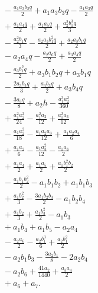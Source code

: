 \begin{align*}
&{}- \frac{a_{1} a_{3} b_{2} q}{2} + a_{1} a_{3} b_{3} q - \frac{a_{1} a_{3} q}{2}\\
&{}+ \frac{a_{1} a_{4} q}{2} + \frac{a_{1} a_{5} q}{2} + \frac{a_{2}^{2} b_{1}^{3} q}{3}\\
&{}- \frac{a_{2}^{2} b_{1} q}{3} - \frac{a_{2} a_{3} b_{1}^{2} q}{2} + \frac{a_{2} a_{3} b_{1} q}{2}\\
&{}- a_{2} a_{4} q - \frac{a_{2} a_{6} q}{2} + \frac{a_{3} a_{4} q}{2}\\
&{}- \frac{a_{3} b_{1}^{2} q}{2} + a_{3} b_{1} b_{2} q + a_{3} b_{1} q\\
&{}- \frac{2 a_{3} b_{2} q}{3} + \frac{a_{3} b_{3} q}{2} + a_{3} b_{4} q\\
&{}- \frac{3 a_{3} q}{8} + a_{2} h - \frac{a_{1}^{3} a_{2}^{2}}{360}\\
&{}+ \frac{a_{1}^{2} a_{2}^{2}}{24} - \frac{a_{1}^{2} a_{2}}{12} + \frac{a_{1}^{2} a_{3}}{12}\\
&{}- \frac{a_{1} a_{2}^{2}}{18} - \frac{a_{1} a_{2} a_{3}}{12} + \frac{a_{1} a_{2} a_{4}}{6}\\
&{}+ \frac{a_{1} a_{2}}{6} - \frac{a_{1} a_{3}^{2}}{12} - \frac{a_{1} a_{3}}{2}\\
&{}+ \frac{a_{1} a_{4}}{2} + \frac{a_{1} a_{5}}{2} + \frac{a_{1} b_{1}^{2} b_{2}}{2}\\
&{}- \frac{a_{1} b_{1} b_{2}^{2}}{2} - a_{1} b_{1} b_{2} + a_{1} b_{1} b_{3}\\
&{}+ \frac{a_{1} b_{2}^{2}}{3} - \frac{3 a_{1} b_{2} b_{3}}{2} - a_{1} b_{2} b_{4}\\
&{}+ \frac{a_{1} b_{2}}{3} + \frac{a_{1} b_{3}^{2}}{2} - a_{1} b_{3}\\
&{}+ a_{1} b_{4} + a_{1} b_{5} - a_{2} a_{4}\\
&{}- \frac{a_{2} a_{6}}{2} - \frac{a_{2} b_{1}^{3}}{6} + \frac{a_{2} b_{1}^{2}}{2}\\
&{}- a_{2} b_{1} b_{3} - \frac{3 a_{2} b_{1}}{8} - 2 a_{2} b_{4}\\
&{}- a_{2} b_{6} + \frac{41 a_{2}}{1440} + \frac{a_{3} a_{4}}{2}\\
&{}+ a_{6} + a_{7}.
\end{align*}
